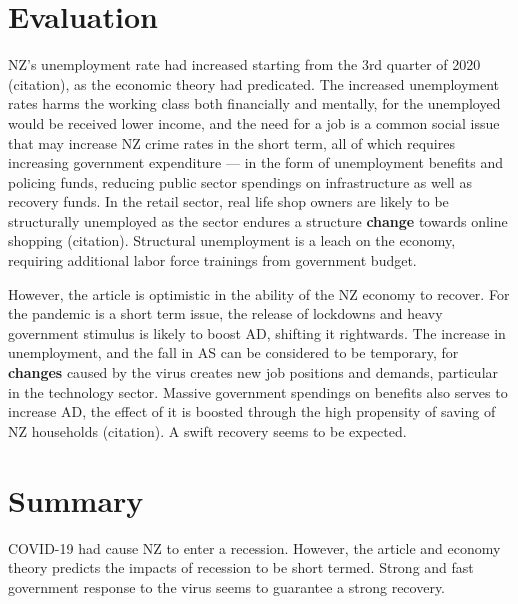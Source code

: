 \documentclass[a4paper,12pt]{article}
\begin{document}
\section*{Evaluation}

NZ's unemployment rate had increased starting from the 3rd quarter of 2020 (citation), as the economic theory had predicated. The increased unemployment rates harms the working class both financially and mentally, for the unemployed would be received lower income, and the need for a job is a common social issue that may increase NZ crime rates in the short term, all of which requires increasing government expenditure --- in the form of unemployment benefits and policing funds, reducing public sector spendings on infrastructure as well as recovery funds. In the retail sector, real life shop owners are likely to be structurally unemployed as the sector endures a structure \textbf{change} towards online shopping (citation). Structural unemployment is a leach on the economy, requiring additional labor force trainings from government budget.

However, the article is optimistic in the ability of the NZ economy to recover. For the pandemic is a short term issue, the release of lockdowns and heavy government stimulus is likely to boost AD, shifting it rightwards. The increase in unemployment, and the fall in AS can be considered to be temporary, for \textbf{changes} caused by the virus creates new job positions and demands, particular in the technology sector. Massive government spendings on benefits also serves to increase AD, the effect of it is boosted through the high propensity of saving of NZ households (citation). A swift recovery seems to be expected.


\section*{Summary}

COVID-19 had cause NZ to enter a recession. However, the article and economy theory predicts the impacts of recession to be short termed. Strong and fast government response to the virus seems to guarantee a strong recovery.

\newpage
\nocite{*}
\printbibliography
\end{document}
